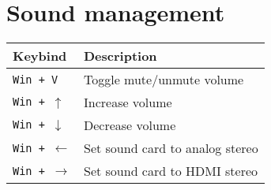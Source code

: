 \documentclass[letterpaper,12pt]{article}
\begin{document}
\section*{Sound management}
\begin{table}[H]
  \begin{tabular}{|C{5cm}|L{10cm}|}
    \hline
    \textbf{Keybind} & \textbf{Description} \\
    \hline
    {\tt Win + V} & Toggle mute/unmute volume \\
    {\tt Win + $\uparrow$} & Increase volume \\
    {\tt Win + $\downarrow$} & Decrease volume \\
    {\tt Win + $\leftarrow$} & Set sound card to analog stereo \\
    {\tt Win + $\rightarrow$} & Set sound card to HDMI stereo \\
    \hline
  \end{tabular}
\end{table}
\end{document}
